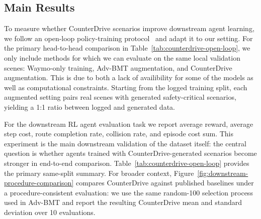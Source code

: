 \documentclass{article}
\begin{document}
\subsection{Main Results}
\label{sec:main-results}
To measure whether CounterDrive scenarios improve downstream agent learning, we follow an open-loop policy-training protocol~\citep{liu2025advbmt} and adapt it to our setting. For the primary head-to-head comparison in Table~\ref{tab:counterdrive-open-loop}, we only include methods for which we can evaluate on the same local validation scenes: Waymo-only training, Adv-BMT augmentation, and CounterDrive augmentation. This is due to both a lack of availibility for some of the models as well as computational constraints. Starting from the logged training split, each augmented setting pairs real scenes with generated safety-critical scenarios, yielding a 1:1 ratio between logged and generated data.

For the downstream RL agent evaluation task we report average reward, average step cost, route completion rate, collision rate, and episode cost sum. This experiment is the main downstream validation of the dataset itself: the central question is whether agents trained with CounterDrive-generated scenarios become stronger in end-to-end comparison. Table~\ref{tab:counterdrive-open-loop} provides the primary same-split summary. For broader context, Figure~\ref{fig:downstream-procedure-comparison} compares CounterDrive against published baselines under a procedure-consistent evaluation: we use the same random-100 selection process used in Adv-BMT \cite{liu2025advbmt} and report the resulting CounterDrive mean and standard deviation over 10 evaluations.
\end{document}
